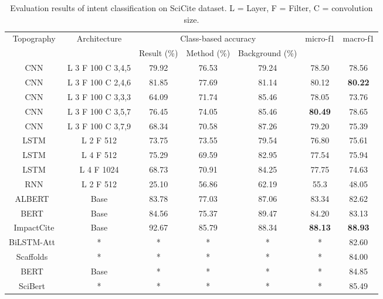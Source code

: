 \documentclass[runningheads]{llncs}
\begin{document}
\begin{table}[!t]
\scriptsize
\renewcommand{\arraystretch}{1.3}
\caption{Evaluation results of intent classification on SciCite\cite{cohan2019structural} dataset. L = Layer, F = Filter, C = convolution size.}
\label{tab:scicite_eval}
\centering
\begin{tabular}{|c|c|c|c|c||c|c|}
\hline
\multirow{2}{*}{Topography} & \multirow{2}{*}{Architecture} & \multicolumn{3}{c||}{Class-based accuracy} & \multirow{2}{*}{micro-f1} & \multirow{2}{*}{macro-f1} \\
\cline{3-5}
 &  & Result (\%) & Method (\%) & Background (\%) &  &  \\
\hline
CNN & L 3 F 100 C 3,4,5  & 79.92 & 76.53 & 79.24 & 78.50 & 78.56 \\
\hline
CNN & L 3 F 100 C 2,4,6  & 81.85 & 77.69 & 81.14 & 80.12 & \textbf{80.22} \\
\hline
CNN & L 3 F 100 C 3,3,3  & 64.09 & 71.74 & 85.46 & 78.05 & 73.76 \\
\hline
CNN & L 3 F 100 C 3,5,7  & 76.45 & 74.05 & 85.46 & \textbf{80.49} & 78.65 \\
\hline
CNN & L 3 F 100 C 3,7,9  & 68.34 & 70.58 & 87.26 & 79.20 & 75.39 \\
\hline
LSTM & L 2 F 512 & 73.75 & 73.55 & 79.54 & 76.80 & 75.61 \\
\hline
LSTM & L 4 F 512 & 75.29 & 69.59 & 82.95 & 77.54 & 75.94 \\
\hline
LSTM & L 4 F 1024 & 68.73 & 70.91 & 84.25 & 77.75 & 74.63 \\
\hline
RNN & L 2 F 512 & 25.10 & 56.86 & 62.19 & 55.3 & 48.05 \\
\hline
\hline
ALBERT~\cite{lan2019albert} & Base & 83.78 & 77.03 & 87.06 & 83.34 & 82.62 \\
\hline
BERT~\cite{devlin2018bert} & Base & 84.56 & 75.37 & 89.47 & 84.20 & 83.13 \\
\hline
ImpactCite & Base & 92.67 & 85.79 & 88.34 & \textbf{88.13} & \textbf{88.93} \\
\hline
\hline
BiLSTM-Att~\cite{cohan2019structural} & * & * & * & * & * & 82.60 \\
\hline
Scaffolds~\cite{cohan2019structural} & * & * & * & * & * & 84.00 \\
\hline
BERT~\cite{beltagy2019scibert,devlin2018bert} & Base & * & * & * & * & 84.85 \\
\hline
SciBert~\cite{beltagy2019scibert} & * & * & * & * & * & 85.49 \\
\hline
\end{tabular}
\end{table}
\end{document}
